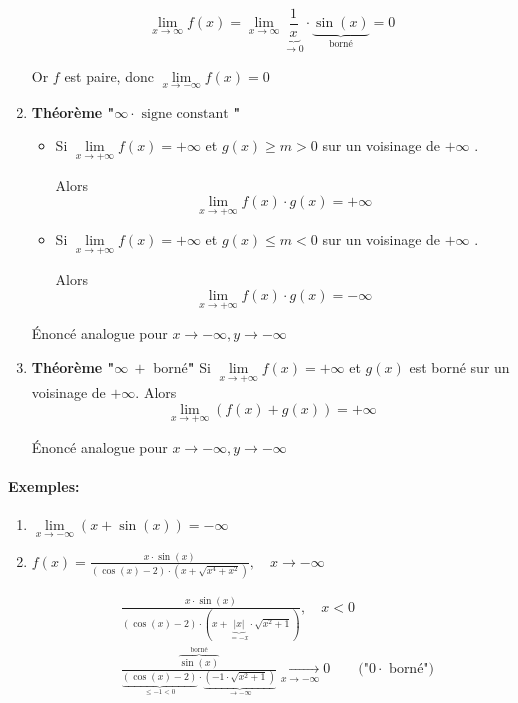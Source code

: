 \documentclass[
    11pt,
    a4paper,
    oneside,
    headinlcude, footinclude,
    twoside,
]{report}
\begin{document}
\begin{enumerate}
$$ \lim_{x \to \infty} f(x) = \lim_{x \to \infty} \underbrace{\frac{1}{x}}_{\to 0} \cdot
\underbrace{\sin(x)}_{\text{borné}} = 0$$

Or $f$ est paire, donc $\lim\limits_{x \to - \infty} f(x) = 0$ 

\item \textbf{Théorème "}$\infty \cdot \text{ signe constant}$ \textbf{"} 

\begin{itemize}
\item Si $\lim\limits_{x \to + \infty} f(x) = + \infty$ et $g (x)
\geq m > 0$ sur un voisinage de $+ \infty$ .


Alors $$ \lim_{x \to + \infty} f(x) \cdot g(x) = + \infty$$

\item Si $\lim\limits_{x \to + \infty} f(x) = + \infty$ et $g (x)
\leq m < 0$ sur un voisinage de $+ \infty$ .


Alors $$ \lim_{x \to + \infty} f(x) \cdot g(x) = - \infty$$
\end{itemize}

Énoncé analogue pour $x \to - \infty,  y \to - \infty$ 

\item \textbf{Théorème "}$\infty\ +$ borné\textbf{"} 
Si $\lim\limits_{x \to + \infty} f(x) = + \infty$ et $g (x)$ est borné
sur un voisinage de $+ \infty$. Alors $$ \lim_{x \to + \infty} (f(x) +
g(x)) = + \infty$$

Énoncé analogue pour $x \to - \infty,  y \to - \infty$ 
\end{enumerate}


\paragraph{Exemples:}

\begin{enumerate}
\item $\lim\limits_{x \to - \infty} (x + \sin(x)) = - \infty$ 

\item $f (x) = \frac{x \cdot \sin(x)}{( \cos(x) - 2) \cdot (x + \sqrt{x^{4}+x^{2}})},
\quad x \to - \infty$ 

\[
\begin{split}
& \frac{x \cdot \sin(x)}{( \cos(x) - 2) \cdot (x + \underbrace{|x|}_{=
- x} \cdot \sqrt{ x^{2} +1})}, \quad x < 0\\
& \frac{ \overbrace{\sin(x)}^{\text{borné}}}{\underbrace{(\cos(x) - 2)}_{\leq
-1 < 0} \cdot \underbrace{(-1 \cdot \sqrt{ x^{2} +1})}_{\to -
\infty}} \xrightarrow[x \to - \infty]{} 0 \quad \quad \text{("$0 \cdot$ borné")}\\
\end{split}
\]
\end{enumerate}
\end{document}
